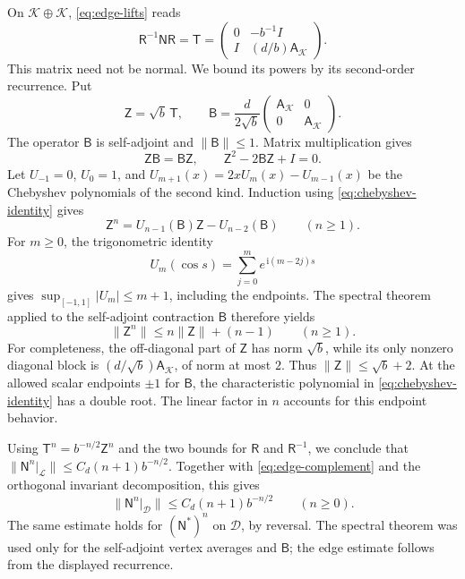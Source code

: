 On \(\mathcal K\oplus\mathcal K\), \eqref{eq:edge-lifts} reads
\[
 \mathsf R^{-1}\mathsf N\mathsf R
 =\mathsf T=
 \begin{pmatrix}
   0&-b^{-1}I\\
   I&(d/b)\mathsf A_{\mathcal K}
 \end{pmatrix}.
\]
This matrix need not be normal.  We bound its powers by its
second-order recurrence.  Put
\[
 \mathsf Z=\sqrt b\,\mathsf T,\qquad
 \mathsf B=\frac d{2\sqrt b}
 \begin{pmatrix}
   \mathsf A_{\mathcal K}&0\\
   0&\mathsf A_{\mathcal K}
 \end{pmatrix}.
\]
The operator \(\mathsf B\) is self-adjoint and
\(\|\mathsf B\|\le1\).  Matrix multiplication gives
\begin{equation}
\label{eq:chebyshev-identity}
 \mathsf Z\mathsf B=\mathsf B\mathsf Z,\qquad
 \mathsf Z^2-2\mathsf B\mathsf Z+I=0.
\end{equation}
Let \(U_{-1}=0\), \(U_0=1\), and
\(U_{m+1}(x)=2xU_m(x)-U_{m-1}(x)\) be the Chebyshev
polynomials of the second kind.  Induction using
\eqref{eq:chebyshev-identity} gives
\[
 \mathsf Z^n
   =U_{n-1}(\mathsf B)\mathsf Z-U_{n-2}(\mathsf B)
   \qquad(n\ge1).
\]
For \(m\ge0\), the trigonometric identity
\[
 U_m(\cos s)=\sum_{j=0}^m e^{\,\mathrm i(m-2j)s}
\]
gives \(\sup_{[-1,1]}|U_m|\le m+1\), including the endpoints.
The spectral theorem applied to the self-adjoint contraction
\(\mathsf B\) therefore yields
\[
 \|\mathsf Z^n\|\le n\|\mathsf Z\|+(n-1)\qquad(n\ge1).
\]
For completeness, the off-diagonal part of \(\mathsf Z\) has norm
\(\sqrt b\), while its only nonzero diagonal block is
\((d/\sqrt b)\mathsf A_{\mathcal K}\), of norm at most \(2\).
Thus \(\|\mathsf Z\|\le\sqrt b+2\).  At the allowed scalar
endpoints \(\pm1\) for \(\mathsf B\), the
characteristic polynomial in \eqref{eq:chebyshev-identity} has a
double root.  The linear factor in \(n\) accounts for this endpoint
behavior.

Using \(\mathsf T^n=b^{-n/2}\mathsf Z^n\) and the two bounds for
\(\mathsf R\) and \(\mathsf R^{-1}\), we conclude that
\(\|\mathsf N^n|_{\mathcal L}\|
\le C_d(n+1)b^{-n/2}\).
Together with \eqref{eq:edge-complement} and the orthogonal invariant
decomposition, this gives
\begin{equation}
\label{eq:edge-power-bound}
 \|\mathsf N^n|_{\mathcal D}\|
 \le C_d(n+1)b^{-n/2}\qquad(n\ge0).
\end{equation}
The same estimate holds for \((\mathsf N^*)^n\) on \(\mathcal D\),
by reversal.  The spectral theorem was used only for the
self-adjoint vertex averages and \(\mathsf B\); the edge
estimate follows from the displayed recurrence.

